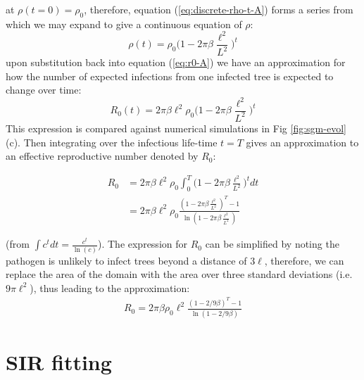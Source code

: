 at $\rho(t=0)=\rho_0$, therefore, equation (\ref{eq:discrete-rho-t-A}) forms a series from which we may expand to give a continuous equation of $\rho$:
\begin{equation}
    \rho(t) = \rho_0 \big(1 - 2\pi\beta\frac{\ell^2}{L^2}\big)^t
\end{equation}{}
upon substitution back into equation (\ref{eq:r0-A}) we have an approximation for how the number of expected infections from one infected tree is expected to change over time:
\begin{equation}
    R_0(t) = 2\pi\beta\ell^2\rho_0 \big(1 - 2\pi\beta\frac{\ell^2}{L^2} \big)^t
    \label{eq:Rt-A}
\end{equation}{}
This expression is compared against numerical simulations in Fig \ref{fig:sgm-evol}(c). Then integrating over the infectious life-time $t=T$ gives an approximation to an effective reproductive number denoted by $R_0$:

\begin{equation} \label{eq1}
\begin{split}
R_0 & = 2\pi\beta\ell^2\rho_0 \int ^T _0 \big(1 - 2\pi\beta\frac{\ell^2}{L^2} \big)^t dt \\
 & = 2\pi\beta\ell^2\rho_0 \frac{ (1 - 2\pi \beta\frac{\ell^2}{L^2})^T - 1}{\ln(1 - 2\pi\beta\frac{\ell^2}{L^2})}
\end{split}
\end{equation}

(from $\int c^t dt = \frac{c^t}{\ln(c)}$). The expression for $R_0$ can be simplified by noting the pathogen is unlikely to infect trees beyond a distance of $3\ell$, therefore, we can replace the area of the domain with the area over three standard deviations (i.e. $9\pi\ell^2$), thus leading to the approximation:
\begin{align*}
    R_0 = 2\pi\beta\rho_0\ell^2 \frac{(1 - 2/9\beta)^T - 1}{\ln(1-2/9\beta)}
\end{align*}

\section{SIR fitting}

